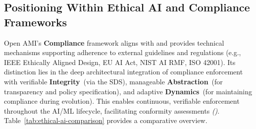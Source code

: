 \documentclass[12pt,a4paper]{report}
\renewcommand{\citep}[1]{\textit{\scriptsize{(\cite{#1})}}}
\newcommand{\Integrity}{\textbf{Integrity}}
\newcommand{\Abstraction}{\textbf{Abstraction}}
\newcommand{\Dynamics}{\textbf{Dynamics}}
\begin{document}
	\subsection{Positioning Within Ethical AI and Compliance Frameworks} %
	\label{sec:5-1-2} %
	
	Open AMI's \textbf{Compliance} framework aligns with and provides technical mechanisms supporting adherence to external guidelines and regulations (e.g., IEEE Ethically Aligned Design, EU AI Act, NIST AI RMF, ISO 42001). Its distinction lies in the deep architectural integration of compliance enforcement with verifiable \Integrity\ (via the SDS), manageable \Abstraction\ (for transparency and policy specification), and adaptive \Dynamics\ (for maintaining compliance during evolution). This enables continuous, verifiable enforcement throughout the AI/ML lifecycle, facilitating conformity assessments \citep{Navigating_AI_Conformity_2025}. Table~\ref{tab:ethical-ai-comparison} provides a comparative overview.
	
\end{document}
